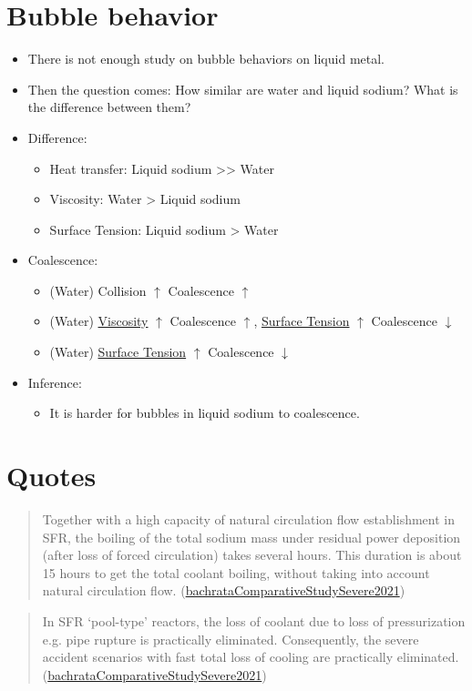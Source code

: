 \documentclass[11pt]{article}
\begin{document}
\section{Bubble behavior}
\label{sec:org679b83b}
\begin{itemize}
\item There is not enough study on bubble behaviors on liquid metal.
\item Then the question comes: How similar are water and liquid sodium? What is the difference between them?
\item Difference:
\begin{itemize}
\item Heat transfer: Liquid sodium >> Water
\item Viscosity: Water > Liquid sodium
\item Surface Tension: Liquid sodium > Water
\end{itemize}
\item Coalescence:
\begin{itemize}
\item (Water) Collision \(\uparrow\) Coalescence \(\uparrow\)
\item (Water) \href{20240313140039-viscosity.org}{Viscosity} \(\uparrow\) Coalescence \(\uparrow\), \href{20240312202630-surface_tension.org}{Surface Tension} \(\uparrow\) Coalescence \(\downarrow\)
\item (Water) \href{20240312202630-surface_tension.org}{Surface Tension} \(\uparrow\) Coalescence \(\downarrow\)
\end{itemize}
\item Inference:
\begin{itemize}
\item It is harder for bubbles in liquid sodium to coalescence.
\end{itemize}
\end{itemize}
\section{Quotes}
\label{sec:org9f52ab6}
\begin{quote}
Together with a high capacity of natural circulation flow establishment in SFR, the boiling of the total sodium mass under residual power deposition (after loss of forced circulation) takes several hours. This duration is about 15 hours to get the total coolant boiling, without taking into account natural circulation flow. (\href{20240315093632-a_comparative_study_on_severe_accident_phenomena_related_to_melt_progression_in_sfr_and_pwr.org}{bachrataComparativeStudySevere2021})
\end{quote}

\begin{quote}
In SFR ‘pool-type’ reactors, the loss of coolant due to loss of pressurization e.g. pipe rupture is practically eliminated. Consequently, the severe accident scenarios with fast total loss of cooling are practically eliminated. (\href{20240315093632-a_comparative_study_on_severe_accident_phenomena_related_to_melt_progression_in_sfr_and_pwr.org}{bachrataComparativeStudySevere2021})
\end{quote}
\end{document}
